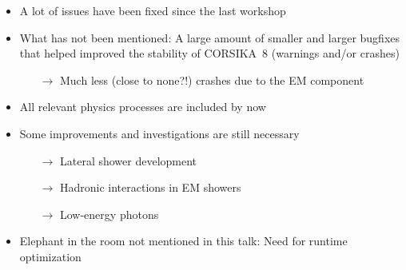 \documentclass[aspectratio=1610, 9pt]{beamer}
\begin{document}
\begin{frame}

    \begin{itemize}
      \item A lot of issues have been fixed since the last workshop
      \item What has not been mentioned: A large amount of smaller and larger bugfixes that helped improved the stability of CORSIKA~8 (warnings and/or crashes)
      \begin{itemize}
        \item[$\rightarrow$] Much less (close to none?!) crashes due to the EM component 
      \end{itemize}
      \item All relevant physics processes are included by now
      \item Some improvements and investigations are still necessary
      \begin{itemize}
        \item[$\rightarrow$] Lateral shower development
        \item[$\rightarrow$] Hadronic interactions in EM showers
        \item[$\rightarrow$] Low-energy photons
      \end{itemize}
      \item Elephant in the room not mentioned in this talk: Need for runtime optimization 
    \end{itemize}
\end{frame}
\end{document}
